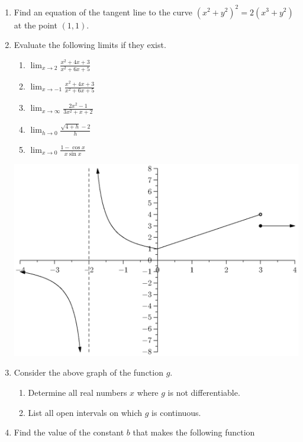 \documentclass[12pt]{article}
\newcommand{\ds}{\displaystyle}
\begin{document}
\begin{enumerate}
\item Find
  an equation of the tangent line to the curve $(x^2+y^2)^2=2(x^3+y^2)$
  at the point $(1,1)$.
\newpage
\item Evaluate
  the following limits if they exist.
  \begin{enumerate}
  \item $\ds \lim_{x\to 2} 
    \frac{x^2+4x+3}{x^2+6x+5}$
\vfill
  \item $\ds \lim_{x\to -1} \frac{x^2+4x+3}{x^2+6x+5}$
\vfill
  \item $\ds \lim_{x\to\infty} \frac{2x^2-1}{3x^2+x+2}$
\vfill
  \item $\ds \lim_{h\to 0} \frac{\sqrt{4+h}-2}{h}$
\vfill
  \item $\ds \lim_{x\to 0} \frac{1-\cos x}{x\sin x}$
\vfill
  \end{enumerate}
\newpage
  \begin{center}
    \includegraphics[width=6in]{grph.eps}%
  \end{center}
\item Consider 
  the above graph of the function $g$.
  \begin{enumerate}
  \item Determine all real numbers $x$ where $g$ is not differentiable.
\vfill
  \item List all open intervals on which $g$ is continuous.
\vfill
  \end{enumerate}
\newpage
\item Find 
  the value of the constant $b$ that makes the following function

\end{enumerate}
\end{document}
